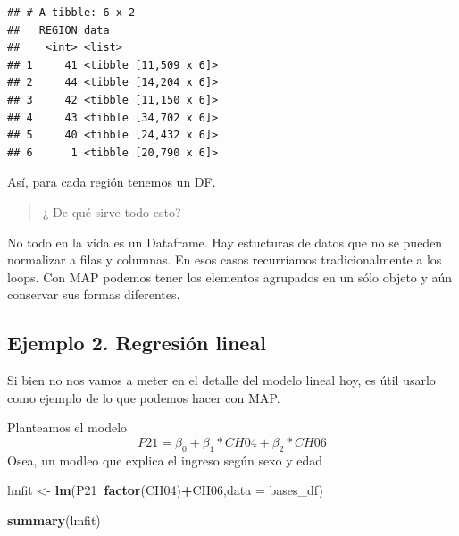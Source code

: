 \documentclass[]{book}
\newenvironment{Shaded}{\begin{snugshade}}{\end{snugshade}}
\newcommand{\DataTypeTok}[1]{\textcolor[rgb]{0.13,0.29,0.53}{#1}}
\newcommand{\KeywordTok}[1]{\textcolor[rgb]{0.13,0.29,0.53}{\textbf{#1}}}
\newcommand{\NormalTok}[1]{#1}
\newcommand{\OperatorTok}[1]{\textcolor[rgb]{0.81,0.36,0.00}{\textbf{#1}}}
\newcommand{\StringTok}[1]{\textcolor[rgb]{0.31,0.60,0.02}{#1}}
\begin{document}
\begin{Shaded}
\end{Shaded}

\begin{verbatim}
## # A tibble: 6 x 2
##   REGION data                 
##    <int> <list>               
## 1     41 <tibble [11,509 x 6]>
## 2     44 <tibble [14,204 x 6]>
## 3     42 <tibble [11,150 x 6]>
## 4     43 <tibble [34,702 x 6]>
## 5     40 <tibble [24,432 x 6]>
## 6      1 <tibble [20,790 x 6]>
\end{verbatim}

Así, para cada región tenemos un DF.

\begin{quote}
¿ De qué sirve todo esto?
\end{quote}

No todo en la vida es un Dataframe. Hay estucturas de datos que no se pueden normalizar a filas y columnas. En esos casos recurríamos tradicionalmente a los loops. Con MAP podemos tener los elementos agrupados en un sólo objeto y aún conservar sus formas diferentes.

\hypertarget{ejemplo-2.-regresion-lineal}{%
\subsection{Ejemplo 2. Regresión lineal}\label{ejemplo-2.-regresion-lineal}}

Si bien no nos vamos a meter en el detalle del modelo lineal hoy, es útil usarlo como ejemplo de lo que podemos hacer con MAP.

Planteamos el modelo
\[
P21 = \beta_0 + \beta_1*CH04 + \beta_2*CH06
\]
Osea, un modleo que explica el ingreso según sexo y edad

\begin{Shaded}
\begin{Highlighting}[]
\NormalTok{lmfit <-}\StringTok{ }\KeywordTok{lm}\NormalTok{(P21}\OperatorTok{~}\KeywordTok{factor}\NormalTok{(CH04)}\OperatorTok{+}\NormalTok{CH06,}\DataTypeTok{data =}\NormalTok{ bases_df)}

\KeywordTok{summary}\NormalTok{(lmfit)}
\end{Highlighting}
\end{Shaded}
\end{document}
